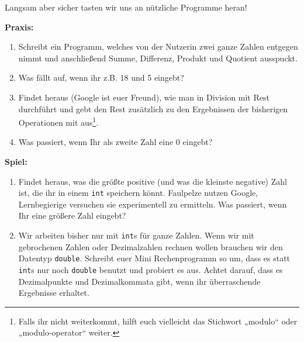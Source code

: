 
Langsam aber sicher tasten wir uns an nützliche Programme heran!

\textbf{Praxis:}
\begin{enumerate}[resume]
\item Schreibt ein Programm, welches von der Nutzerin zwei ganze Zahlen entgegen
  nimmt und anschließend Summe, Differenz, Produkt und Quotient ausspuckt.
\item Was fällt auf, wenn ihr z.B. 18 und 5 eingebt?
\item Findet heraus (Google ist euer Freund), wie man in \Java Division mit Rest
  durchführt und gebt den Rest zusätzlich zu den Ergebnissen der bisherigen
  Operationen mit aus\footnote{Falls ihr nicht weiterkommt, hilft euch
    vielleicht das Stichwort „modulo“ oder „modulo-operator“ weiter.}.
\item Was passiert, wenn Ihr als zweite Zahl eine 0 eingebt?
\end{enumerate}

\textbf{Spiel:}
\begin{enumerate}
\item Findet heraus, was die größte positive (und was die kleinste negative)
  Zahl ist, die ihr in einem \texttt{int} speichern könnt. Faulpelze nutzen
  Google, Lernbegierige versuchen sie experimentell zu ermitteln. Was passiert,
  wenn Ihr eine größere Zahl eingebt?
\item Wir arbeiten bisher nur mit \texttt{int}s für ganze Zahlen. Wenn wir mit
  gebrochenen Zahlen oder Dezimalzahlen rechnen wollen brauchen wir den Datentyp
  \texttt{double}. Schreibt euer Mini Rechenprogramm so um, dass es statt
  \texttt{int}s nur noch \texttt{double} benutzt und probiert es aus. Achtet
  darauf, dass es Dezimalpunkte und Dezimalkommata gibt, wenn ihr überraschende
  Ergebnisse erhaltet.
\end{enumerate}
